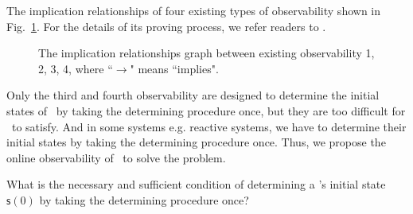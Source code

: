 The implication relationships of four existing types of observability shown in Fig.~\ref{fig:9}. For the details of its proving process, we refer readers to \cite{Zhang2016Observability}.

 \begin{figure}[thpb]
      \centering
      
      \caption{The implication relationships graph between existing observability 1, 2, 3, 4, where ``$\rightarrow$" means ``implies".}
      \label{fig:9}
   \end{figure}

   

 

Only the third and fourth observability are designed to determine the initial states of \BCNs\ by taking the determining procedure once, but they are too difficult for \BCNs\ to satisfy. And in some systems e.g. reactive systems, we have to determine their initial states by taking the determining procedure once. Thus, we propose the online observability of \BCNs\ to solve the problem.

 \begin{problem}
\label{pro:2}
What is the necessary and sufficient condition of determining a \BCN's initial state $\mathsf{s}(0)$ by taking the determining procedure once?
\end{problem}

